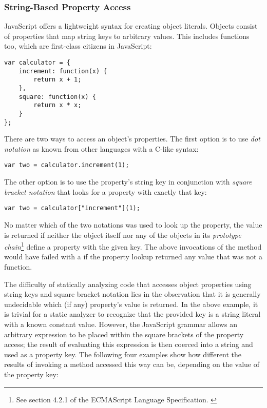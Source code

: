 \subsubsection{String-Based Property Access}

JavaScript offers a lightweight syntax for creating object literals. Objects consist of properties that map string keys to arbitrary values. This includes functions too, which are first-class citizens in JavaScript:

\begin{verbatim}
var calculator = {
    increment: function(x) {
        return x + 1;
    },
    square: function(x) {
        return x * x;
    }
};
\end{verbatim}

There are two ways to access an object's properties. The first option is to use \textit{dot notation} as known from other languages with a C-like syntax:

\begin{verbatim}
var two = calculator.increment(1);
\end{verbatim}

The other option is to use the property's string key in conjunction with \textit{square bracket notation} that looks for a property with exactly that key:

\begin{verbatim}
var two = calculator["increment"](1);
\end{verbatim}

No matter which of the two notations was used to look up the property, the value  is returned if neither the object itself nor any of the objects in its \emph{prototype chain}\footnote{See section 4.2.1 of the ECMAScript Language Specification. \cite{es5-spec}} define a property with the given key. The above invocations of the  method would have failed with a  if the property lookup returned any value that was not a function.

The difficulty of statically analyzing code that accesses object properties using string keys and square bracket notation lies in the observation that it is generally undecidable which (if any) property's value is returned. In the above example, it is trivial for a static analyzer to recognize that the provided key is a string literal with a known constant value. However, the JavaScript grammar allows an arbitrary expression to be placed within the square brackets of the property access; the result of evaluating this expression is then coerced into a string and used as a property key. The following four examples show how different the results of invoking a method accessed this way can be, depending on the value of the property key:

